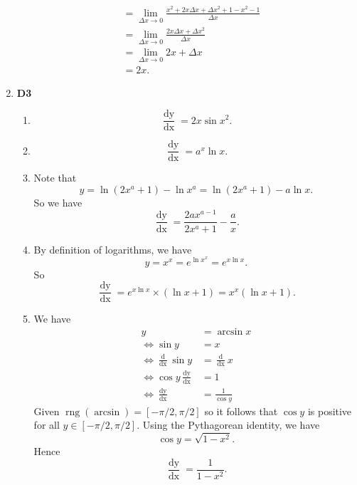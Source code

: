 \documentclass[12pt,oneside]{book}
\DeclareMathOperator{\rng}{rng}
\begin{document}
\begin{enumerate}
\begin{align*}
            &= \lim_{\Delta x \to 0} \frac{x^2 + 2x \Delta x + \Delta x^2 + 1 - x^2 - 1}{\Delta x} \\
            &= \lim_{\Delta x \to 0} \frac{2x \Delta x + \Delta x^2}{\Delta x} \\
            &= \lim_{\Delta x \to 0} 2x + \Delta x \\
            &= 2x.
        \end{align*} 
        \item \textbf{D3} \begin{enumerate}
            \item \[
                \frac{\mathop{\mathrm{d}y}}{\mathop{\mathrm{d}x}} = 2x \sin x^2 
            .\] 
            \item \[
                \frac{\mathop{\mathrm{d}y}}{\mathop{\mathrm{d}x}} = a^x \ln x
            .\] 
            \item Note that \[
                y = \ln (2x^a + 1) - \ln x^a = \ln (2x^a + 1) - a\ln x
            .\] So we have \[
                \frac{\mathop{\mathrm{d}y}}{\mathop{\mathrm{d}x}} = \frac{2ax^{a-1}}{2x^a + 1} - \frac{a}{x}
            .\] 
            \item By definition of logarithms, we have \[
                y = x^x = e^{\ln x^x} = e^{x \ln x}
            .\] So \[
                \frac{\mathop{\mathrm{d}y}}{\mathop{\mathrm{d}x}} = e^{x \ln x} \times (\ln x + 1) = x^x (\ln x + 1)
            .\] 
            \item We have \begin{align*}
                y &= \arcsin x \\
                \iff \sin y &= x \\
                \iff \frac{\mathop{\mathrm{d}}}{\mathop{\mathrm{d}x}} \sin y &= \frac{\mathop{\mathrm{d}}}{\mathop{\mathrm{d}x}} x \\
                \iff \cos y \frac{\mathop{\mathrm{d}y}}{\mathop{\mathrm{d}x}} &= 1 \\
                \iff \frac{\mathop{\mathrm{d}y}}{\mathop{\mathrm{d}x}} &= \frac{1}{\cos y}
            \end{align*}
            Given $\rng(\arcsin)  = [-\pi/2, \pi/2]$ so it follows that $\cos y$ is positive for all $y \in [-\pi/2, \pi/2]$. Using the Pythagorean identity, we have \[
                \cos y = \sqrt{1 - x^2} 
            .\] Hence \[
                \frac{\mathop{\mathrm{d}y}}{\mathop{\mathrm{d}x}} = \frac{1}{1-x^2}
            .\] 
        \end{enumerate}

\end{enumerate}
\end{document}
